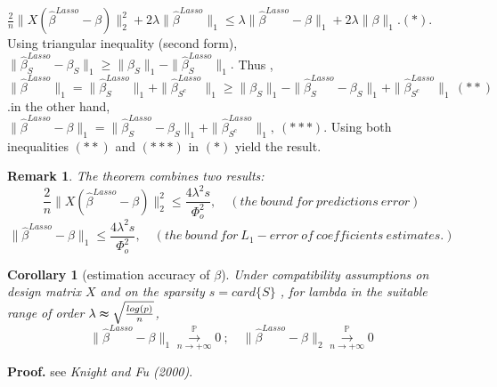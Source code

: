 \documentclass[12pt]{report}
\newtheorem{remarque}{Remark}[section]
\newtheorem{corollaire}{Corollary}
\begin{document}
$\frac{2}{n}\parallel X(\hat{\beta}^{Lasso}-\beta )\parallel^{2}_{2}+ 2\lambda \parallel \hat{\beta}^{Lasso}\parallel_{1}\leq \lambda \parallel \hat{\beta}^{Lasso}-\beta \parallel_{1}+2 \lambda \parallel \beta \parallel_{1}. (\ast)$. Using triangular inequality (second form), $\parallel \hat{\beta}^{Lasso}_{S}-\beta_{S} \parallel_{1}\geq \parallel \beta_{S} \parallel_{1} - \parallel\hat{\beta}^{Lasso}_{S} \parallel_{1}.$ Thus ,\\

$\parallel\hat{\beta}^{Lasso} \parallel_{1}=\parallel\hat{\beta}^{Lasso}_{S} \parallel_{1}+\parallel\hat{\beta}^{Lasso}_{S^{c}} \parallel_{1}\geq \parallel \beta_{S} \parallel_{1} -\parallel \hat{\beta}^{Lasso}_{S}-\beta_{S} \parallel_{1}+ \parallel\hat{\beta}^{Lasso}_{S^{c}} \parallel_{1}\, (\ast \ast)$.in the other hand,\\
$\parallel \hat{\beta}^{Lasso}-\beta \parallel_{1}=\parallel \hat{\beta}^{Lasso}_{S}-\beta_{S} \parallel_{1}+\parallel\hat{\beta}^{Lasso}_{S^{c}} \parallel_{1},\ (\ast \ast \ast).$ Using both inequalities $(\ast \ast)$ and $(\ast \ast \ast)$ in $(\ast)$ yield the result.

\begin{remarque}
 The theorem combines two results: 
 \begin{equation}
 	\frac{2}{n}\parallel X(\hat{\beta}^{Lasso}-\beta )\parallel^{2}_{2}\leq \frac{4 \lambda^{2}s}{\Phi_{o}^{2}}, \quad ( the\ bound\ for\ predictions\ error)
 	\label{f37}
 \end{equation}
\begin{equation}
	\parallel \hat{\beta}^{Lasso}-\beta \parallel_{1}\leq \frac{4 \lambda^{2}s}{\Phi_{o}^{2}}, \quad ( the\ bound\ for\ L_{1}-error\ of\ coefficients\ estimates.)
	\label{f38}
\end{equation}
\end{remarque}
\begin{corollaire}[estimation accuracy of $\beta$]
	Under compatibility assumptions on design matrix $X$ and on the sparsity $s=card\{S\}$ , for lambda in the suitable range of order $\lambda \thickapprox \sqrt{\frac{log(p)}{n}}$,
	\begin{equation}
			\parallel \hat{\beta}^{Lasso}-\beta \parallel_{1} \overset{\mathbb{P}}{\underset{n\rightarrow +\infty}{\longrightarrow}}0\ ;\quad \parallel \hat{\beta}^{Lasso}-\beta \parallel_{2} \overset{\mathbb{P}}{\underset{n\rightarrow +\infty}{\longrightarrow}}0
			\label{f39}
	\end{equation}
\end{corollaire}
\textbf{Proof.} see \textit{Knight and Fu (2000)}.
\end{document}

